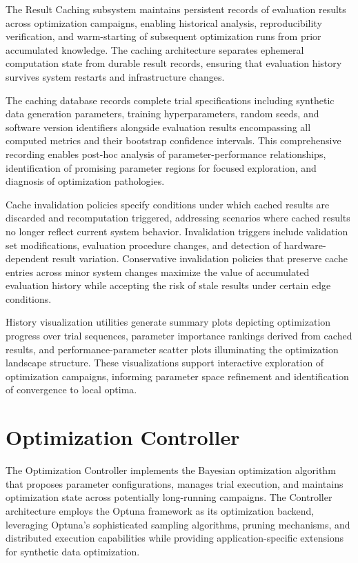 The Result Caching subsystem maintains persistent records of evaluation results across optimization campaigns, enabling historical analysis, reproducibility verification, and warm-starting of subsequent optimization runs from prior accumulated knowledge. The caching architecture separates ephemeral computation state from durable result records, ensuring that evaluation history survives system restarts and infrastructure changes.

The caching database records complete trial specifications including synthetic data generation parameters, training hyperparameters, random seeds, and software version identifiers alongside evaluation results encompassing all computed metrics and their bootstrap confidence intervals. This comprehensive recording enables post-hoc analysis of parameter-performance relationships, identification of promising parameter regions for focused exploration, and diagnosis of optimization pathologies.

Cache invalidation policies specify conditions under which cached results are discarded and recomputation triggered, addressing scenarios where cached results no longer reflect current system behavior. Invalidation triggers include validation set modifications, evaluation procedure changes, and detection of hardware-dependent result variation. Conservative invalidation policies that preserve cache entries across minor system changes maximize the value of accumulated evaluation history while accepting the risk of stale results under certain edge conditions.

History visualization utilities generate summary plots depicting optimization progress over trial sequences, parameter importance rankings derived from cached results, and performance-parameter scatter plots illuminating the optimization landscape structure. These visualizations support interactive exploration of optimization campaigns, informing parameter space refinement and identification of convergence to local optima.

\section{Optimization Controller}
\label{sec:optimization_controller}

The Optimization Controller implements the Bayesian optimization algorithm that proposes parameter configurations, manages trial execution, and maintains optimization state across potentially long-running campaigns. The Controller architecture employs the Optuna framework as its optimization backend, leveraging Optuna's sophisticated sampling algorithms, pruning mechanisms, and distributed execution capabilities while providing application-specific extensions for synthetic data optimization.

